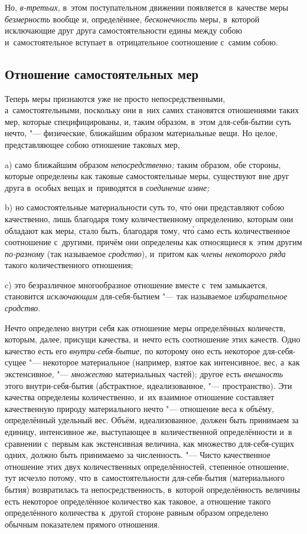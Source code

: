 Но, {\em в-третьих,} в~этом поступательном движении появляется в~качестве меры
{\em безмерность} вообще и, определённее, {\em бесконечность} меры, в~которой
исключающие друг друга самостоятельности едины между собою и~самостоятельное
вступает в~отрицательное соотношение с~самим собою.

\subsection{Отношение самостоятельных мер}

Теперь меры признаются уже не просто непосредственными, а~самостоятельными,
поскольку они в~них самих становятся отношениями таких мер, которые
специфицированы, и, таким образом, в~этом для-себя-бытии суть нечто, "---
физические, ближайшим образом материальные вещи. Но целое, представляющее
собою отношение таковых мер,

a) само ближайшим образом {\em непосредственно;} таким образом, обе стороны,
которые определены как таковые самостоятельные меры, существуют вне друг друга
в~особых вещах и~приводятся в {\em соединение извне;}

b) но самостоятельные материальности суть то, чт\'{о} они представляют собою
качественно, лишь благодаря тому количественному определению, которым они
обладают как меры, стало быть, благодаря тому, чт\'{о} само есть количественное
соотношение с~другими, причём они определены как относящиеся к~этим другим
{\em по-разному} (так называемое {\em сродство}), и~притом как
{\em члены некоторого ряда} такого количественного отношения;

c) это безразличное многообразное отношение вместе с~тем замыкается,
становится {\em исключающим} для-себя-бытием "--- так называемое
{\em избирательное сродство}.


Нечто определено внутри себя как отношение меры определённых количеств,
которым, далее, присущи качества, и~нечто есть соотношение этих качеств. Одно
качество есть его {\em внутри-себя-бытие,} по которому оно есть некоторое
для-себя-сущее "--- некоторое материальное (например, взятое как интенсивное,
вес, а~как экстенсивное, "--- {\em множество} материальных частей); другое есть
{\em внешность} этого внутри-себя-бытия (абстрактное, идеализованное, "---
пространство). Эти качества определены количественно, и~их взаимное отношение
составляет качественную природу материального нечто "--- отношение веса к
объёму, определённый удельный вес. Объём, идеализованное, должен быть
принимаем за единицу, интенсивное же, выступающее в~количественной
определённости и~в сравнении с~первым как экстенсивная величина, как множество
для-себя-сущих одних, должно быть принимаемо за численность. "--- Чисто
качественное отношение этих двух количественных определённостей, степенн\'{о}е
отношение, тут исчезло потому, что в~самостоятельности для-себя-бытия
(материального бытия) возвратилась та непосредственность, в~которой
определённость величины есть некоторое определённое количество как таковое, а
отношение такого определённого количества к~другой стороне равным образом
определено обычным показателем прямого отношения.

